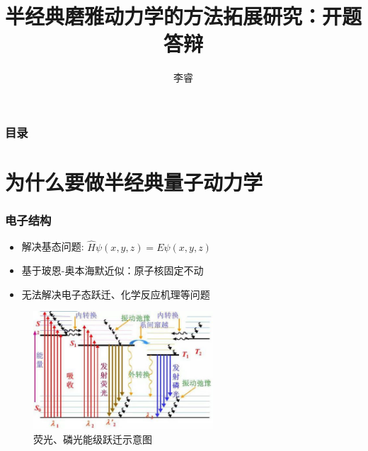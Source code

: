 \documentclass{beamer}
\title{\bfseries 半经典磨雅动力学的方法拓展研究：开题答辩}
\author{李睿}
\begin{document}
\begin{frame}[t]\frametitle{}
    
\maketitle

\end{frame}

\begin{frame}[t]\frametitle{目录}
\tableofcontents
\end{frame}

\section{为什么要做半经典量子动力学}
\begin{frame}[t]\frametitle{电子结构}
   
\begin{itemize}
 \item 解决基态问题: $\hat{H}\psi (x,y,z) = E \psi (x,y,z)$
 \item 基于玻恩-奥本海默近似：原子核固定不动
 \item 无法解决电子态跃迁、化学反应机理等问题
\end{itemize}

\begin{figure}
\includegraphics[width=0.6\textwidth]{fluoresence.jpg}
\caption{荧光、磷光能级跃迁示意图}
\end{figure}
\end{frame}
\end{document}
